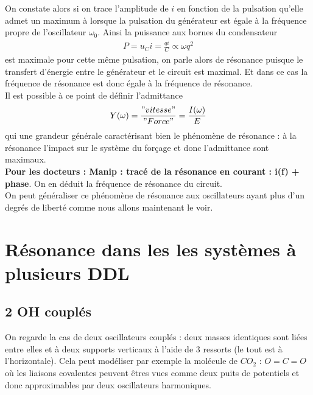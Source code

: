 \documentclass[12pt,prb,aps,epsf]{article}
\begin{document}
On constate alors si on trace l'amplitude de $i$ en fonction de la pulsation qu'elle admet un maximum à lorsque la pulsation du générateur est égale à la fréquence propre de l'oscillateur $\omega_0$. Ainsi la puissance aux bornes du condensateur 
\begin{eqnarray}
P = u_Ci = \frac{qi}{C} \propto \omega q^2
\end{eqnarray}
est maximale pour cette même pulsation, on parle alors de résonance puisque le transfert d'énergie entre le générateur et le circuit est maximal. Et dans ce cas la fréquence de résonance est donc égale à la fréquence de résonance.\\

Il est possible à ce point de définir l'admittance
\begin{eqnarray}
Y(\omega) = \frac{"vitesse"}{"Force"} = \frac{I(\omega)}{E}
\end{eqnarray}
qui une grandeur générale caractérisant bien le phénomène de résonance : à la résonance l'impact sur le système du forçage et donc l'admittance sont maximaux.\\

\textbf{Pour les docteurs : Manip : tracé de la résonance en courant : i(f) + phase}. On en déduit la fréquence de résonance du circuit.\\

On peut généraliser ce phénomène de résonance aux oscillateurs ayant plus d'un degrés de liberté comme nous allons maintenant le voir.

\section{Résonance dans les les systèmes à plusieurs DDL}
\subsection{2 OH couplés}
On regarde la cas de deux oscillateurs couplés : deux masses identiques sont liées entre elles et à deux supports verticaux à l'aide de 3 ressorts (le tout est à l'horizontale). Cela peut modéliser par exemple la molécule de $CO_2$ : $O=C=O$ où les liaisons covalentes peuvent êtres vues comme deux puits de potentiels et donc approximables par deux oscillateurs harmoniques.\\
\end{document}
